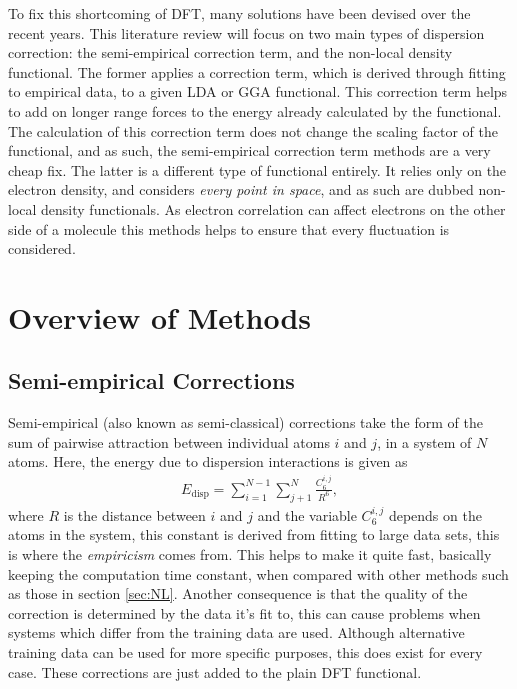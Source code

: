 \documentclass[10pt,a4paper,twocolumn,twoside]{extarticle}
\begin{document}
	To fix this shortcoming of DFT, many solutions have been devised over the recent years. This literature review will focus on two main types of dispersion correction: the semi-empirical correction term, and the non-local density functional. The former applies a correction term, which is derived through fitting to empirical data, to a given LDA or GGA functional. This correction term helps to add on longer range forces to the energy already calculated by the functional. The calculation of this correction term does not change the scaling factor of the functional, and as such, the semi-empirical correction term methods are a very cheap fix. The latter is a different type of functional entirely. It relies only on the electron density, and considers \emph{every point in space}, and as such are dubbed non-local density functionals. As electron correlation can affect electrons on the other side of a molecule this methods helps to ensure that every fluctuation is considered.

	\section{Overview of Methods}
	\subsection{Semi-empirical Corrections}
	\label{sec:semi-empirical}
	Semi-empirical (also known as semi-classical) corrections take the form of the sum of pairwise attraction between individual atoms $i$ and $j$, in a system of $N$ atoms. Here, the energy due to dispersion interactions is given as
	\begin{align}
		E_\text{disp} = \sum_{i=1}^{N-1} \sum_{j+1}^N \frac{C^{i,j}_6}{R^6},
	\end{align}
	where $R$ is the distance between $i$ and $j$ and the variable $C^{i,j}_6$ depends on the atoms in the system, this constant is derived from fitting to large data sets, this is where the \emph{empiricism} comes from. This helps to make it quite fast, basically keeping the computation time constant, when compared with other methods such as those in section \ref{sec:NL}. Another consequence is that the quality of the correction is determined by the data it's fit to, this can cause problems when systems which differ from the training data are used.\cite{Sato2009, Grimme2010} Although alternative training data can be used for more specific purposes\cite{D3-ABC}, this does exist for every case. These corrections are just added to the plain DFT functional.
\end{document}
